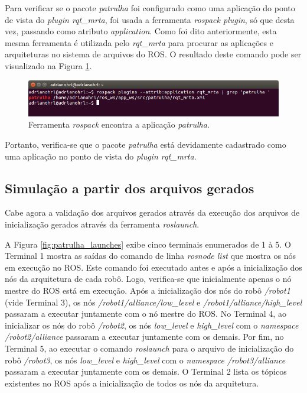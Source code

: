             Para verificar se o pacote \textit{patrulha} foi configurado como uma aplicação do ponto de vista do \textit{plugin rqt\_mrta}, foi usada a ferramenta \textit{rospack plugin}, só que desta vez, passando como atributo \textit{application}. Como foi dito anteriormente, esta mesma ferramenta é utilizada pelo \textit{rqt\_mrta} para procurar as aplicações e arquiteturas no sistema de arquivos do ROS. O resultado deste comando pode ser visualizado na Figura \ref{fig:rospack_patrulha}.
        
            \begin{figure}[htb]
                \centering
                \includegraphics[width=.95\textwidth]{Figuras/4_resultados/rqt_mrta_patrulha.png}
                \caption{Ferramenta \textit{rospack} encontra a aplicação \textit{patrulha}.} \label{fig:rospack_patrulha}
            \end{figure}
            
            Portanto, verifica-se que o pacote \textit{patrulha} está devidamente cadastrado como uma aplicação no ponto de vista do \textit{plugin rqt\_mrta}.
            
        \subsection{Simulação a partir dos arquivos gerados} \label{subsec:sim_patrulha}
            Cabe agora a validação dos arquivos gerados através da execução dos arquivos de inicialização gerados através da ferramenta \textit{roslaunch}. 
            
            A Figura \ref{fig:patrulha_launches} exibe cinco terminais enumerados de 1 à 5. O Terminal 1 mostra as saídas do comando de linha \textit{rosnode list} que mostra os nós em execução no ROS. Este comando foi executado antes e após a inicialização dos nós da arquitetura de cada robô. Logo, verifica-se que inicialmente apenas o nó mestre do ROS está em execução. Após a inicialização dos nós do robô \textit{/robot1} (vide Terminal 3), os nós \textit{/robot1/alliance/low\_level} e \textit{/robot1/alliance/high\_level} passaram a executar juntamente com o nó mestre do ROS. No Terminal 4, ao inicializar os nós do robô \textit{/robot2}, os nós \textit{low\_level} e \textit{high\_level} com o \textit{namespace /robot2/alliance} passaram a executar juntamente com os demais. Por fim, no Terminal 5, ao executar o comando \textit{roslaunch} para o arquivo de inicialização do robô \textit{/robot3}, os nós \textit{low\_level} e \textit{high\_level} com o \textit{namespace /robot3/alliance} passaram a executar juntamente com os demais. O Terminal 2 lista os tópicos existentes no ROS após a inicialização de todos os nós da arquitetura.
            
